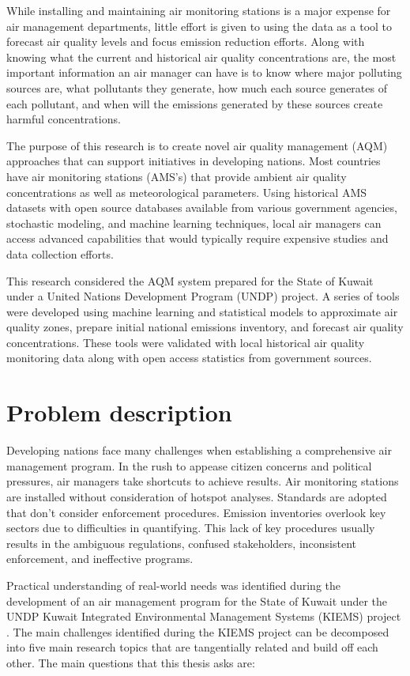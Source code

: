 While installing and maintaining air monitoring stations is a major expense for air management departments,  little effort is given to using the data as a tool to forecast air quality levels and focus emission reduction efforts. Along with knowing what the current and historical air quality concentrations are, the most important information an air manager can have is to know where major polluting sources are, what pollutants they generate, how much each source generates of each pollutant, and when will the emissions generated by these sources create harmful concentrations.

The purpose of this research is to create novel air quality management (AQM) approaches that can support initiatives in developing nations. Most countries have air monitoring stations (AMS's) that provide ambient air quality concentrations as well as meteorological parameters. Using historical AMS datasets with open source databases available from various government agencies, stochastic modeling, and machine learning techniques, local air managers can access advanced capabilities that would typically require expensive studies and data collection efforts.

This research considered the AQM system prepared for the State of Kuwait under a United Nations Development Program (UNDP) project. A series of tools were developed using machine learning and statistical models to approximate air quality zones, prepare initial national emissions inventory, and forecast air quality concentrations.  These tools were validated with local historical air quality monitoring data along with open access statistics from government sources.

\section{Problem description}

Developing nations face many challenges when establishing a comprehensive air management program. In the rush to appease citizen concerns and political pressures, air managers take shortcuts to achieve results. Air monitoring stations are installed without consideration of hotspot analyses. Standards are adopted that don't consider enforcement procedures. Emission inventories overlook key sectors due to difficulties in quantifying. This lack of key procedures usually results in the ambiguous regulations, confused stakeholders, inconsistent enforcement, and ineffective programs.

Practical understanding of real-world needs was identified during the development of an air management program for the State of Kuwait under the UNDP Kuwait Integrated Environmental Management Systems (KIEMS) project \citep{UNDP2012}.  The main challenges identified during the KIEMS project can be decomposed into five main research topics that are tangentially related and build off each other. The main questions that this thesis asks are:

